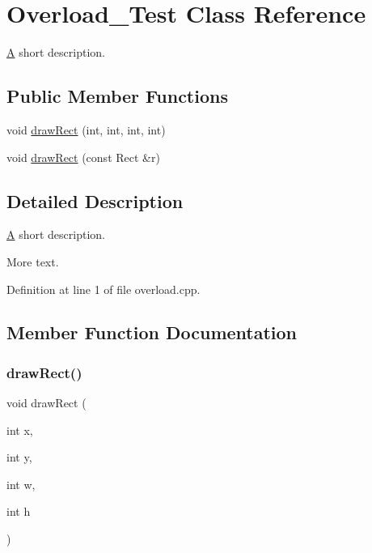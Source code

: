 \hypertarget{class_overload___test}{}\section{Overload\+\_\+\+Test Class Reference}
\label{class_overload___test}


\hyperlink{class_a}{A} short description.  


\subsection*{Public Member Functions}
\begin{DoxyCompactItemize}
\item 
void \hyperlink{class_overload___test_a45ad96862a0aa8ad8993a75356e3a6e2}{draw\+Rect} (int, int, int, int)
\item 
void \hyperlink{class_overload___test_ab694ef31f21b39129051d079925cc271}{draw\+Rect} (const Rect \&r)
\end{DoxyCompactItemize}


\subsection{Detailed Description}
\hyperlink{class_a}{A} short description. 

More text. 

Definition at line 1 of file overload.\+cpp.



\subsection{Member Function Documentation}
\mbox{\label{class_overload___test_a45ad96862a0aa8ad8993a75356e3a6e2}} 
\subsubsection{\texorpdfstring{draw\+Rect()}{drawRect()}\hspace{0.1cm}{\footnotesize\ttfamily [1/2]}}
{\footnotesize\ttfamily void draw\+Rect (\begin{DoxyParamCaption}\item[{int}]{x,  }\item[{int}]{y,  }\item[{int}]{w,  }\item[{int}]{h }\end{DoxyParamCaption})}

